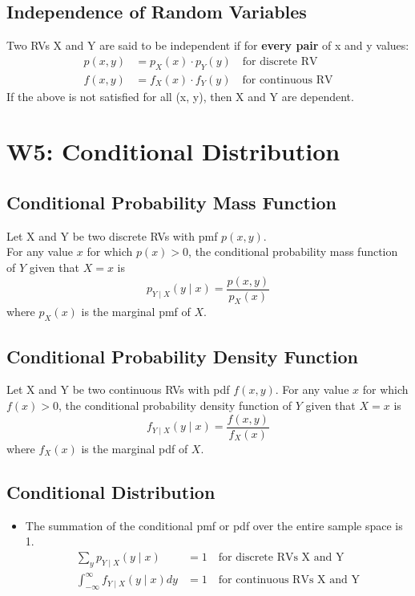 \documentclass[a4paper]{article}
\begin{document}
\subsection{Independence of Random Variables}
Two RVs X and Y are said to be independent if for \textbf{every pair} of x and y values:
\begin{align*}
    p(x, y) &= p_{X}(x)\cdot p_{Y}(y) \quad \text{for discrete RV}\\
    f(x, y) &= f_{X}(x)\cdot f_{Y}(y) \quad \text{for continuous RV}
\end{align*}
If the above is not satisfied for all (x, y), then X and Y are dependent.
\newpage
\section{W5: Conditional Distribution}
\subsection{Conditional Probability Mass Function} 
Let X and Y be two discrete RVs with pmf $p(x, y)$.\\For any value $x$ for which $p(x) > 0$, the conditional probability mass function of $Y$ given that $X = x$ is 
$$p_{Y\mid X}(y\mid x) = \frac{p(x, y)}{p_{X}(x)}
$$
where $p_{X}(x)$ is the marginal pmf of $X$.
\subsection{Conditional Probability Density Function} 
Let X and Y be two continuous RVs with pdf $f(x, y)$. For any value $x$ for which $f(x) > 0$, the conditional probability density function of $Y$ given that $X = x$ is 
$$f_{Y\mid X}(y\mid x) = \frac{f(x, y)}{f_{X}(x)}
$$
where $f_{X}(x)$ is the marginal pdf of $X$.
\subsection{Conditional Distribution}
\begin{itemize}
    \item The summation of the conditional pmf or pdf over the entire sample space is 1.
    \begin{align*}
        \sum_{y}p_{Y\mid X}(y\mid x) &= 1 \quad \text{for discrete RVs X and Y}\\
        \int_{-\infty}^{\infty}f_{Y\mid X}(y\mid x) dy & = 1 \quad \text{for continuous RVs X and Y}
    \end{align*}
\end{itemize}
\end{document}

